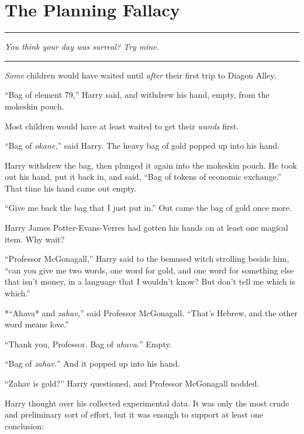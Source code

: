 \chapter{The Planning Fallacy}\label{the-planning-fallacy}

\begin{center}\rule{3in}{0.4pt}\end{center}

\emph{You think your day was surreal? Try mine.}

\begin{center}\rule{3in}{0.4pt}\end{center}

\emph{Some} children would have waited until \emph{after} their first
trip to Diagon Alley.

``Bag of element 79,'' Harry said, and withdrew his hand, empty, from
the mokeskin pouch.

Most children would have at least waited to get their \emph{wands}
first.

``Bag of \emph{okane,}'' said Harry. The heavy bag of gold popped up
into his hand.

Harry withdrew the bag, then plunged it again into the mokeskin pouch.
He took out his hand, put it back in, and said, ``Bag of tokens of
economic exchange.'' That time his hand came out empty.

``Give me back the bag that I just put in.'' Out came the bag of gold
once more.

Harry James Potter-Evans-Verres had gotten his hands on at least one
magical item. Why wait?

``Professor McGonagall,'' Harry said to the bemused witch strolling
beside him, ``can you give me two words, one word for gold, and one word
for something else that isn't money, in a language that I wouldn't know?
But don't tell me which is which.''

*``Ahava* and \emph{zahav,}'' said Professor McGonagall. ``That's
Hebrew, and the other word means love.''

``Thank you, Professor. Bag of \emph{ahava.}'' Empty.

``Bag of \emph{zahav.}'' And it popped up into his hand.

``Zahav is gold?'' Harry questioned, and Professor McGonagall nodded.

Harry thought over his collected experimental data. It was only the most
crude and preliminary sort of effort, but it was enough to support at
least one conclusion:

